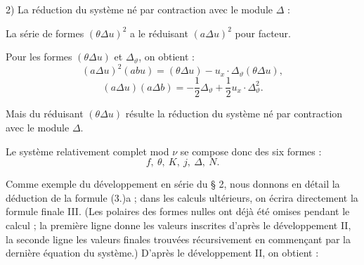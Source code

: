 \documentclass[11pt]{article}
\newcommand{\A}{\Delta}
\begin{document}
2) La réduction du système né par contraction avec le module $\A$ :

La série de formes $(\theta\A u)^2$ a le réduisant $(a\A u)^2$ pour facteur.

Pour les formes $(\theta\A u)$ et $\A_\vartheta$, on obtient :
\[
(a\A u)^2(abu)=(\theta\A u)-u_x\cdot\A_\vartheta(\theta\A u),
\]
\[
(a\A u)(a\A b)=-\frac12\A_\vartheta+\frac12u_x\cdot\A_\vartheta^2.
\]

Mais du réduisant $(\theta\A u)$ résulte la réduction du système né par contraction avec le module $\A$.

\bigskip


Le système relativement complet mod $\nu$ se compose donc des six formes :
\[
f,\ \theta,\ K,\ j,\ \A,\ N.
\]

Comme exemple du développement en série du \S{} 2, nous donnons en détail la déduction de la formule (3.)a ; dans les calculs ultérieurs, on écrira directement la formule finale III. (Les polaires des formes nulles ont déjà été omises pendant le calcul ; la première ligne donne les valeurs inscrites d'après le développement II, la seconde ligne les valeurs finales trouvées récursivement en commençant par la dernière équation du système.) D'après le développement II, on obtient :
\end{document}
